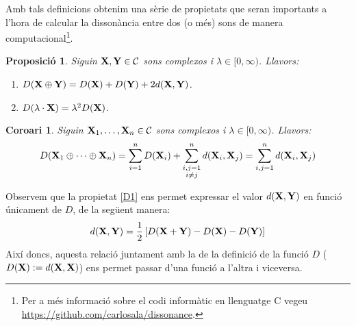 \documentclass{article}
\theoremstyle{math}
\newtheorem{prop}[definition]{Proposició}
\newtheorem{corollary}[definition]{Coro\lgem ari}
\theoremstyle{TheoremNum}
\newcommand{\0}{\ensuremath{\vb{0}}}
\newcommand{\X}{\ensuremath{\vb{X}}}
\newcommand{\Y}{\ensuremath{\vb{Y}}}
\begin{document}
\noindent Amb tals definicions obtenim una sèrie de propietats que seran importants a l'hora de calcular la dissonància entre dos (o més) sons de manera computacional\footnote{Per a més informació sobre el codi informàtic en llenguatge C vegeu \url{https://github.com/carlosala/dissonance}.}.
\begin{prop}\label{prop_dem2}
    Siguin $\X,\Y\in\mathcal{C}$ sons complexos i $\lambda\in[0,\infty)$. Llavors:
    \begin{enumerate}[label=$D$\arabic*),ref=$D$\arabic*]
        \item\label{D1} $D(\X\oplus\Y)=D(\X)+D(\Y)+2d(\X,\Y)$.
        \item\label{D2} $D(\lambda\cdot \X)=\lambda^2D(\X)$.
    \end{enumerate}
\end{prop}
\begin{corollary}\label{coro_dem3}
    Siguin $\X_1,\ldots,\X_n\in\mathcal{C}$ sons complexos i $\lambda\in[0,\infty)$. Llavors:
    \begin{equation}\label{eq_final}
        D(\X_1\oplus\cdots\oplus\X_n)=\sum_{i=1}^nD(\X_i)+\sum_{\substack{i,j=1\\i\ne j}}^nd(\X_i,\X_j)=\sum_{i,j=1}^nd(\X_i,\X_j)
    \end{equation}
\end{corollary}
\noindent Observem que la propietat \ref{D1} ens permet expressar el valor $d(\X,\Y)$ en funció únicament de $D$, de la següent manera: $$d(\X,\Y)=\frac{1}{2}\left[D(\X+\Y)-D(\X)-D(\Y)\right]$$
Així doncs, aquesta relació juntament amb la de la definició de la funció $D$ ($D(\X):=d(\X,\X)$) ens permet passar d'una funció a l'altra i viceversa.\par 
\end{document}
